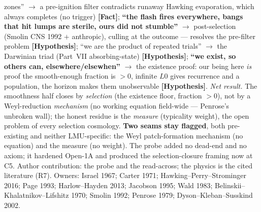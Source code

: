 \documentclass[11pt]{article}
\newcommand{\Fact}{\textbf{\textcolor{green!45!black}{[Fact]}}}
\newcommand{\Hyp}{\textbf{\textcolor{blue!55!black}{[Hypothesis]}}}
\begin{document}
zones'' $\to$ a pre-ignition filter contradicts runaway Hawking evaporation, which always completes (no trigger) \Fact; \textbf{``the flash fires everywhere, bangs that hit lumps are sterile, ours did not stumble''} $\to$ post-selection (Smolin CNS 1992 $+$ anthropic), culling at the outcome --- resolves the pre-filter problem \Hyp; ``we are the product of repeated trials'' $\to$ the Darwinian triad (Part~VII absorbing-state) \Hyp; \textbf{``we exist, so others can, elsewhere/elsewhen''} $\to$ the existence proof: our being here \emph{is} proof the smooth-enough fraction is $>0$, infinite $L0$ gives recurrence and a population, the horizon makes them unobservable \Hyp. \emph{Net result.} The smoothness half closes by \emph{selection} (the existence floor, fraction $>0$), not by a Weyl-reduction \emph{mechanism} (no working equation field-wide --- Penrose's unbroken wall); the honest residue is the \emph{measure} (typicality weight), the open problem of every selection cosmology. \textbf{Two seams stay flagged}, both pre-existing and neither LMU-specific: the Weyl patch-formation mechanism (no equation) and the measure (no weight). The probe added no dead-end and no axiom; it hardened Open-1A and produced the selection-closure framing now at C5. Author contribution: the probe and the read-across; the physics is the cited literature (R7). Owners: Israel 1967; Carter 1971; Hawking--Perry--Strominger 2016; Page 1993; Harlow--Hayden 2013; Jacobson 1995; Wald 1983; Belinskii--Khalatnikov--Lifshitz 1970; Smolin 1992; Penrose 1979; Dyson--Kleban--Susskind 2002.
\end{document}
